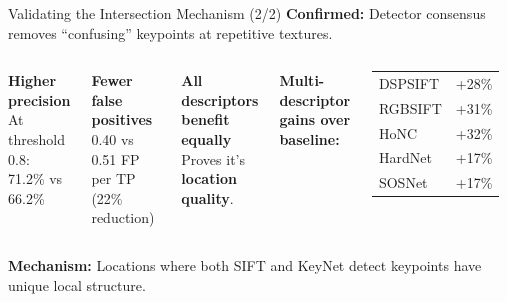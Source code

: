\documentclass[aspectratio=169, 12pt]{beamer}
\begin{document}
\begin{frame}{Validating the Intersection Mechanism (2/2)}
  \textbf{Confirmed:} Detector consensus removes ``confusing'' keypoints at repetitive textures.
  \begin{columns}[T]
    \textbf{\color{improve} Higher precision}\\
    {\small At threshold 0.8: 71.2\% vs 66.2\%}
    \vspace{0.6em}

    \textbf{\color{improve} Fewer false positives}\\
    {\small 0.40 vs 0.51 FP per TP (22\% reduction)}
    \vspace{0.6em}

    \textbf{\color{improve} All descriptors benefit equally}\\
    {\small Proves it's \textbf{location quality}.}

    {\small\textbf{Multi-descriptor gains over baseline:}}
    \begin{table}[h]
    \centering\small
    \begin{tabular}{lr}
      \toprule
      DSPSIFT & +28\% \\
      RGBSIFT & +31\% \\
      HoNC & +32\% \\
      HardNet & +17\% \\
      SOSNet & +17\% \\
      \bottomrule
    \end{tabular}
    \end{table}
  \end{columns}
  \vspace{0.3em}
  {\small \textbf{Mechanism:} Locations where both SIFT and KeyNet detect keypoints have unique local structure.}
\end{frame}
\end{document}
